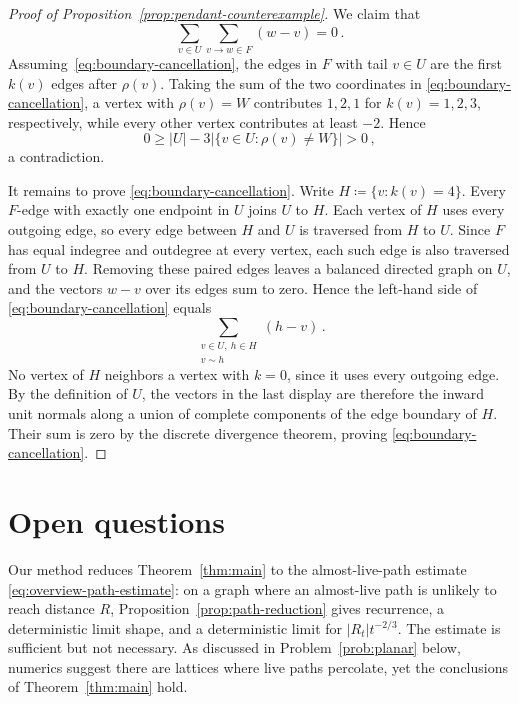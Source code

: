 \documentclass[11pt]{amsart}
\theoremstyle{plain}
\theoremstyle{definition}
\begin{document}
\begin{proof}[Proof of Proposition~\ref{prop:pendant-counterexample}]
		
		We claim that 
		\begin{equation}\label{eq:boundary-cancellation}
			\sum_{v\in U}\sum_{v\to w\in F}(w-v)=0\, .
		\end{equation}
		Assuming~\eqref{eq:boundary-cancellation}, the edges in $F$ with tail $v\in U$
		are the first $k(v)$ edges after $\rho(v)$. Taking the sum of the two coordinates in
		\eqref{eq:boundary-cancellation}, a vertex with $\rho(v)=W$ contributes
		$1,2,1$ for $k(v)=1,2,3$, respectively, while every other vertex contributes
		at least $-2$.  Hence
		\[
		0\geq |U|-3\bigl|\{v\in U:\rho(v)\ne W\}\bigr|>0\, ,
		\]
		a contradiction. 

		It remains to prove \eqref{eq:boundary-cancellation}.  Write
		$H\coloneqq\{v:k(v)=4\}$.  Every $F$-edge with exactly one endpoint in $U$
		joins $U$ to $H$.  Each vertex of $H$ uses every outgoing edge, so every edge
		between $H$ and $U$ is traversed from $H$ to $U$.  Since $F$ has equal
		indegree and outdegree at every vertex, each such edge is also traversed from
		$U$ to $H$.  Removing these paired edges leaves a balanced directed graph on
		$U$, and the vectors $w-v$ over its edges sum to zero.  Hence the left-hand
		side of \eqref{eq:boundary-cancellation} equals
		\[
			\sum_{\substack{v\in U,\ h\in H\\ v\sim h}}(h-v)\, .
		\]
		No vertex of $H$ neighbors a vertex with $k=0$, since it uses every outgoing
		edge.  By the definition of $U$, the vectors in the last display are therefore
		the inward unit normals along a union of complete components of the edge
		boundary of $H$.  Their sum is zero by the discrete divergence theorem, proving
		\eqref{eq:boundary-cancellation}.
	\end{proof}
	
	
	\section{Open questions}\label{sec:further-questions}
	Our method reduces Theorem~\ref{thm:main} to the almost-live-path estimate
	\eqref{eq:overview-path-estimate}: on a graph where an almost-live path is unlikely to
	reach distance $R$, Proposition~\ref{prop:path-reduction} gives recurrence, a
	deterministic limit shape, and a deterministic limit for $|R_t|t^{-2/3}$.  The estimate is
	sufficient but not necessary.  As discussed in Problem~\ref{prob:planar} 
	below, numerics suggest there are lattices where live paths percolate, 
	yet the conclusions of Theorem~\ref{thm:main} hold. 
\end{document}
